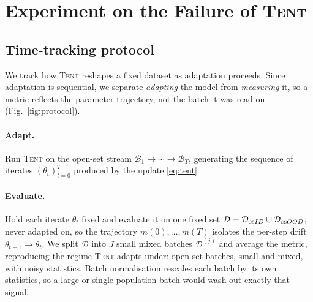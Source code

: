 \documentclass[11pt]{article}
\newcommand{\csid}{\textsc{cs}ID}
\newcommand{\csood}{\textsc{cs}OOD}
\newcommand{\D}{\mathcal{D}}
\newcommand{\method}[1]{\textsc{#1}}
\begin{document}
\section{Experiment on the Failure of \method{Tent}}\label{sec:experiment}

\subsection{Time-tracking protocol}\label{sec:protocol}

We track how \method{Tent} reshapes a fixed dataset as adaptation
proceeds. Since adaptation is sequential, we separate \emph{adapting} the
model from \emph{measuring} it, so a metric reflects the parameter
trajectory, not the batch it was read on (Fig.~\ref{fig:protocol}).

\paragraph{Adapt.} Run \method{Tent} on the open-set stream
$\mathcal{B}_1\!\to\!\cdots\!\to\!\mathcal{B}_T$, generating the sequence
of iterates $(\theta_t)_{t=0}^{T}$ produced by the update \eqref{eq:tent}.

\paragraph{Evaluate.} Hold each iterate $\theta_t$ fixed and evaluate it on
one fixed set $\D=\D_{\csid}\cup\D_{\csood}$, never adapted on, so the
trajectory $m(0),\dots,m(T)$ isolates the per-step drift
$\theta_{t-1}\!\to\!\theta_t$. We
split $\D$ into $J$ small mixed batches $\D^{(j)}$ and average the
metric, reproducing the regime \method{Tent} adapts under: open-set
batches, small and mixed, with noisy statistics. Batch normalisation
rescales each batch by its own statistics, so a large or
single-population batch would wash out exactly that signal.
\end{document}
